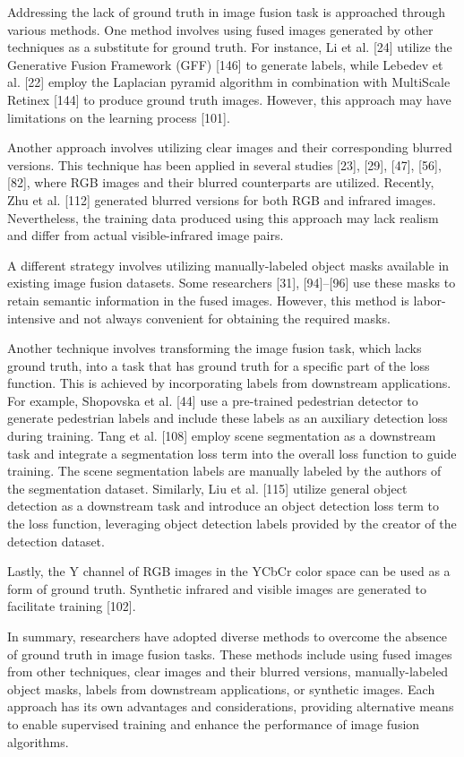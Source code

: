 Addressing the lack of ground truth in image fusion task is approached through various methods. One method involves using fused images generated by other techniques as a substitute for ground truth. For instance, Li et al. [24] utilize the Generative Fusion Framework (GFF) [146] to generate labels, while Lebedev et al. [22] employ the Laplacian pyramid algorithm in combination with MultiScale Retinex [144] to produce ground truth images. However, this approach may have limitations on the learning process [101].

Another approach involves utilizing clear images and their corresponding blurred versions. This technique has been applied in several studies [23], [29], [47], [56], [82], where RGB images and their blurred counterparts are utilized. Recently, Zhu et al. [112] generated blurred versions for both RGB and infrared images. Nevertheless, the training data produced using this approach may lack realism and differ from actual visible-infrared image pairs.

A different strategy involves utilizing manually-labeled object masks available in existing image fusion datasets. Some researchers [31], [94]–[96] use these masks to retain semantic information in the fused images. However, this method is labor-intensive and not always convenient for obtaining the required masks.

Another technique involves transforming the image fusion task, which lacks ground truth, into a task that has ground truth for a specific part of the loss function. This is achieved by incorporating labels from downstream applications. For example, Shopovska et al. [44] use a pre-trained pedestrian detector to generate pedestrian labels and include these labels as an auxiliary detection loss during training. Tang et al. [108] employ scene segmentation as a downstream task and integrate a segmentation loss term into the overall loss function to guide training. The scene segmentation labels are manually labeled by the authors of the segmentation dataset. Similarly, Liu et al. [115] utilize general object detection as a downstream task and introduce an object detection loss term to the loss function, leveraging object detection labels provided by the creator of the detection dataset.

Lastly, the Y channel of RGB images in the YCbCr color space can be used as a form of ground truth. Synthetic infrared and visible images are generated to facilitate training [102].

In summary, researchers have adopted diverse methods to overcome the absence of ground truth in image fusion tasks. These methods include using fused images from other techniques, clear images and their blurred versions, manually-labeled object masks, labels from downstream applications, or synthetic images. Each approach has its own advantages and considerations, providing alternative means to enable supervised training and enhance the performance of image fusion algorithms.
